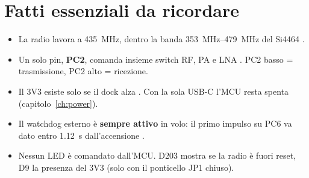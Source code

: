 \section{Fatti essenziali da ricordare}
\begin{itemize}
\item La radio lavora a \SI{435}{\mega\hertz}, dentro la banda \SIrange{353}{479}{\mega\hertz} del Si4464 .
\item Un solo pin, \textbf{PC2}, comanda insieme switch RF, PA e LNA . PC2 basso = trasmissione, PC2 alto = ricezione.
\item Il 3V3 esiste solo se il dock alza . Con la sola USB-C l'MCU resta spenta (capitolo~\ref{ch:power}).
\item Il watchdog esterno è \textbf{sempre attivo} in volo: il primo impulso su PC6 va dato entro \SI{1.12}{\second} dall'accensione .
\item Nessun LED è comandato dall'MCU. D203 mostra se la radio è fuori reset, D9 la presenza del 3V3 (solo con il ponticello JP1 chiuso).
\end{itemize}
